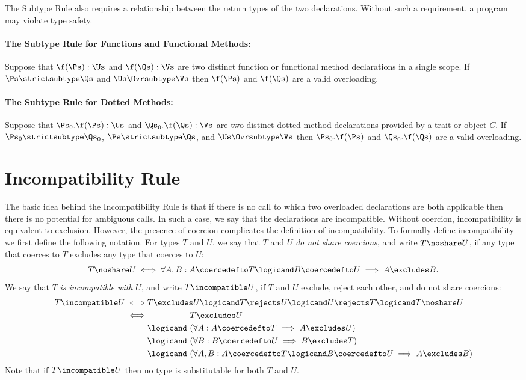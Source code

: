 The Subtype Rule also requires a relationship between the return types
of the two declarations.  Without such a requirement, a program may
violate type safety.

\paragraph{The Subtype Rule for Functions and Functional Methods:}
Suppose that $\f(\Ps) : \Us$ and $\f(\Qs) : \Vs$ are two distinct
function or functional method declarations in a single scope.
If $\Ps \strictsubtype \Qs$ and $\Us \Ovrsubtype \Vs$ then $\f(\Ps)$ and
$\f(\Qs)$ are a valid overloading.

\paragraph{The Subtype Rule for Dotted Methods:}
Suppose that $\Ps_0.\f(\Ps) : \Us$ and $\Qs_0.\f(\Qs) : \Vs$ are two
distinct dotted method declarations provided by a trait or object $C$.
If $\Ps_0 \strictsubtype \Qs_0$, $\Ps \strictsubtype \Qs$,
and $\Us \Ovrsubtype
\Vs$ then $\Ps_0.\f(\Ps)$ and $\Qs_0.\f(\Qs)$ are a valid overloading.

\section{Incompatibility Rule}

The basic idea behind the Incompatibility Rule is that if there is no
call to which two overloaded declarations are both applicable
then there is no potential for ambiguous calls.  In such a case, we say
that the declarations are incompatible.
Without coercion, incompatibility is equivalent to exclusion.
However, the presence of coercion complicates the definition of
incompatibility.  To formally define incompatibility we first define the
following notation.
%
For types $T$ and $U$,
we say that $T$ and $U$ \emph{do not share coercions}, and write
$T \noshare U$, if any type that coerces to $T$ excludes any type
that coerces to $U$:
\[
T \noshare U \iff \forall A,B: A \coercedefto T \logicand B \coercedefto U
                               \implies A \excludes B.
\]
%
We say that $T$ \emph{is incompatible with} $U$, and write $T
\incompatible U$, if $T$ and $U$ exclude, reject each other, and do
not share coercions:
\begin{align*}
T \incompatible U \iff
&T \excludes U \logicand T \rejects U \logicand U \rejects T \logicand  T \noshare U \\
\iff
&\phantom{\logicand\ } T \excludes U \\
&\logicand\ (\forall A: A \coercedefto T \implies A \excludes U) \\
&\logicand\ (\forall B: B \coercedefto U \implies B \excludes T) \\
&\logicand\ (\forall A,B: A \coercedefto T \logicand B \coercedefto U
                          \implies A \excludes B)
\end{align*}
Note that if $T \incompatible U$ then no type is substitutable for
both $T$ and $U$.

